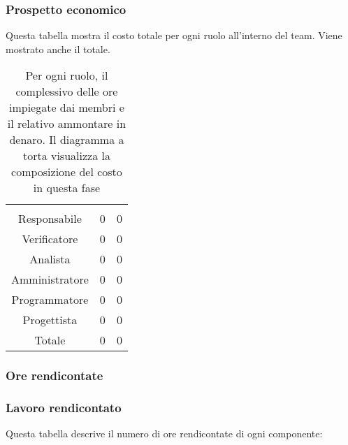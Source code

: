 \subsubsection{Prospetto economico}
Questa tabella mostra il costo totale per ogni ruolo all'interno del team. Viene mostrato anche il totale.

\begin{table}[hbt!]
{\setlength{\parindent}{0cm}
\begin{minipage}{.43\textwidth}
	\begin{tabular}{ccc}
	\rowcolorhead
	\headertitle{Ruolo} & \headertitle{Ore} & \headertitle{Costo(€)}\\
	Responsabile & 0 & 0\\
	Verificatore & 0 & 0\\
	Analista & 0 & 0\\
	Amministratore & 0 & 0\\
	Programmatore & 0 & 0\\
	Progettista & 0 & 0\\
	\hline
	Totale & 0& 0\\
	\end{tabular}
\end{minipage}%
\begin{minipage}{.57\textwidth}
\end{minipage} }
\caption{Per ogni ruolo, il complessivo delle ore impiegate dai membri e il relativo ammontare in denaro. Il diagramma a torta visualizza la composizione del costo in questa fase}
\end{table}



\subsubsection{Ore rendicontate}
\subsubsection{Lavoro rendicontato}
Questa tabella descrive il numero di ore rendicontate di ogni componente:

